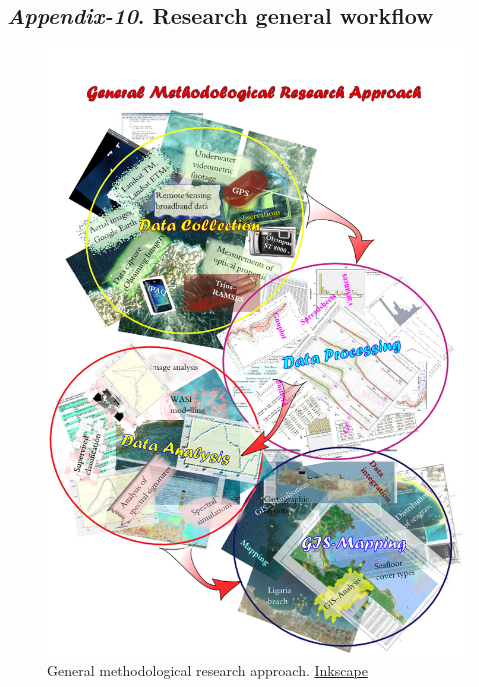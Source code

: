 \documentclass[11pt]{article}
\begin{document}
\begin{appendices}
\subsection{\textit{Appendix-10}. Research general workflow}
\begin{figure}[H]
	\centering
	\includegraphics[scale=0.57]{UML_GIS.png}
	\caption{General methodological research approach. \href{http://inkscape.org/}{Inkscape}}
	\label{fig:1.11}
\end{figure}

\end{appendices}
\pagebreak
\clearpage
\end{document}
